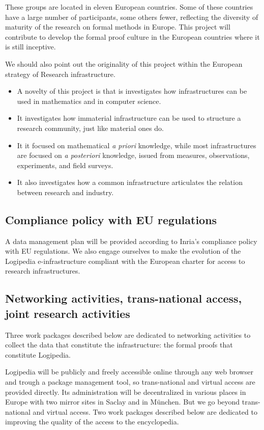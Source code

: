 These groups are located in eleven European countries.  Some of these
countries have a large number of participants, some others fewer,
reflecting the diversity of maturity of the research on formal methods
in Europe. This project will contribute to develop the formal proof
culture in the European countries where it is still inceptive.

We should also point out the originality of this project within the
European strategy of Research infrastructure. 
\begin{itemize}
\item A novelty of this
project is that is investigates how infrastructures can be used in
mathematics and in computer science. 
\item It investigates how immaterial
infrastructure can be used to structure a research community, just
like material ones do. 
\item It it focused on mathematical {\em a priori} knowledge, while
  most infrastructures are focused on {\em a posteriori} knowledge,
  issued from measures, observations, experiments, and field surveys. 
\item It also investigates how a common infrastructure articulates the
  relation between research and industry.
\end{itemize}


\subsection{Compliance policy with EU regulations}

A data management plan will be provided according to Inria’s
compliance policy with EU regulations. We also engage ourselves to
make the evolution of the Logipedia e-infrastructure compliant
with the European charter for access to research infrastructures.

\subsection{Networking activities, trans-national access, joint
  research activities}

Three work packages described below are dedicated to networking activities
to collect the data that constitute the infrastructure: the formal proofs
that constitute Logipedia.

Logipedia will be publicly and freely accessible online through any
web browser and trough a package management tool, so trans-national
and virtual access are provided directly. Its administration will be
decentralized in various places in Europe with two mirror sites in
Saclay and in München. But we go beyond trans-national and virtual
access.  Two work packages described below are dedicated to improving
the quality of the access to the encyclopedia.

